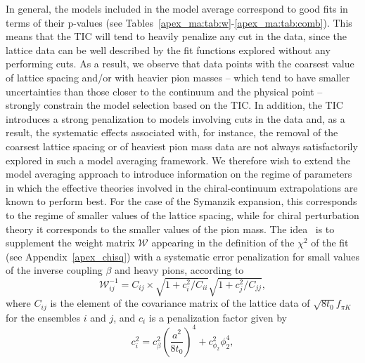 In general, the models included in the model average correspond to good fits in terms of their p-values (see Tables~\ref{apex_ma:tab:w}-\ref{apex_ma:tab:comb}). This means that the TIC will tend to heavily penalize any cut in the data, since the lattice data can be well described by the fit functions explored without any performing cuts. As a result, we observe that data points with the coarsest value of lattice spacing and/or with heavier pion masses -- which tend to have smaller uncertainties than those closer to the continuum and the physical point -- strongly constrain the model selection based on the TIC. In addition, the TIC introduces a strong  penalization to models involving cuts in the data and, as a result, the systematic effects associated with, for instance, the removal of the coarsest lattice spacing or of heaviest pion mass data are not always satisfactorily explored in such a model averaging framework. We therefore wish to extend the model averaging approach to introduce information on the regime of parameters in which the effective theories involved in the chiral-continuum extrapolations are known to perform best. For the case of the Symanzik expansion, this corresponds to the regime of smaller values of the lattice spacing, while for chiral perturbation theory it corresponds to the smaller values of the pion mass. The idea~\citep{DallaBrida:2016kgh} is to supplement the weight matrix $\mathcal{W}$ appearing in the definition of the $\chi^2$ of the fit (see Appendix~\ref{apex_chisq}) with a systematic error penalization for small values of the inverse coupling $\beta$ and heavy pions, according to 
\begin{equation}
\label{ch_ss:eq:Wpenal}
\mathcal{W}_{ij}^{-1}=C_{ij}\times\sqrt{1+c_i^2/C_{ii}}\sqrt{1+c_j^2/C_{jj}},
\end{equation}
where $C_{ij}$ is the element of the covariance matrix of the lattice data of $\sqrt{8t_0}f_{\pi K}$ for the ensembles $i$ and $j$, and $c_i$ is a penalization factor given by
\begin{equation}
\label{ch_ss:eq:penal}
c_i^2=c_{\beta}^2\left(\frac{a^2}{8t_0}\right)^4+c_{\phi_2}^2\phi_2^4,
\end{equation}
